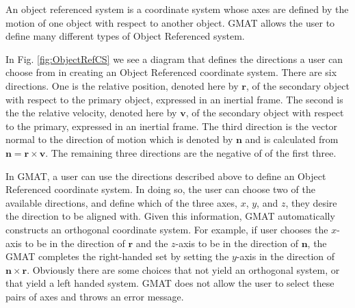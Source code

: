 {An object referenced system is a coordinate system whose axes are
defined by the motion of one object with respect to another
object. GMAT allows the user to define many different types of
Object Referenced system.
%
%
In Fig. \ref{fig:ObjectRefCS} we see a diagram that defines the
directions a user can choose from in creating an Object Referenced
coordinate system.  There are six directions.  One is the relative
position, denoted here by $\mathbf{r}$, of the secondary object
with respect to the primary object, expressed in an inertial
frame. The second is the the relative velocity, denoted here by
$\mathbf{v}$, of the secondary object with respect to the primary,
expressed in an inertial frame. The third direction is the vector
normal to the direction of motion which is denoted by $\mathbf{n}$
and is calculated from $\mathbf{n} = \mathbf{r} \times
\mathbf{v}$.  The remaining three directions are the negative of
of the first three.

In GMAT, a user can use the directions described above to define
an Object Referenced coordinate system.  In doing so, the user can
choose two of the available directions, and define which of the
three axes, $x$, $y$, and $z$, they desire the direction to be
aligned with.  Given this information, GMAT automatically
constructs an orthogonal coordinate system.  For example, if user
chooses the $x$-axis to be in the direction of $\mathbf{r}$ and
the $z$-axis to be in the direction of $\mathbf{n}$, the GMAT
completes the right-handed set by setting the $y$-axis in the
direction of $\mathbf{n} \times \mathbf{r}$.  Obviously there are
some choices that not yield an orthogonal system, or that yield a
left handed system.  GMAT does not allow the user to select these
pairs of axes and throws an error message.

}
